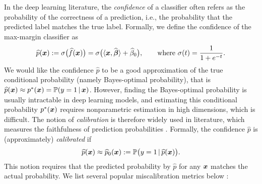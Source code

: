 In the deep learning literature, the \emph{confidence} of a classifier often refers as the probability of the correctness of a prediction, i.e., the probability that the predicted label matches the true label. Formally, we define the confidence of the max-margin classifier as
    \begin{equation*}
        \widehat p(\text{\boldmath $x$}) := \sigma\bigl( \widehat f(\text{\boldmath $x$}) \bigr) = 
        \sigma\bigl( \langle \text{\boldmath $x$}, \widehat{{\boldsymbol{\beta}}} \rangle + \widehat\beta_0 \bigr), \qquad \text{where}~\sigma(t) = \frac{1}{1 + e^{-t}}.
    \end{equation*}
We would like the confidence $\hat p$ to be a good approximation of the true conditional probability (namely Bayes-optimal probability), that is $\widehat p(\text{\boldmath $x$}) \approx p^*(\text{\boldmath $x$}) = \mathbb{P}( y = 1 \,|\, \text{\boldmath $x$} )$.
However, finding the Bayes-optimal probability is usually intractable in deep learning models, and estimating this conditional probability $p^*({\boldsymbol{x}})$ requires nonparametric estimation in high dimensions, which is difficult. %
The notion of \emph{calibration} is therefore widely used in literature, which measures the faithfulness of prediction probabilities \cite{murphy1967verification, dawid1982well, gupta2020distribution, guo2017calibration}.
Formally, the confidence $\hat p$ is (approximately) \emph{calibrated} if
\begin{equation}\label{eq:calibrated}
    \widehat p(\text{\boldmath $x$}) \approx \widehat p_0(\text{\boldmath $x$}) := \mathbb{P} \bigl( y = 1 \,|\,  \widehat p(\text{\boldmath $x$}) \bigr).
\end{equation}
This notion requires that the predicted probability by $\hat p$ for any ${\boldsymbol{x}}$ matches the actual probability.
We list several popular miscalibration metrics below \cite{kumar2019verified, kuleshov2015calibrated, vaicenavicius2019evaluating}:
